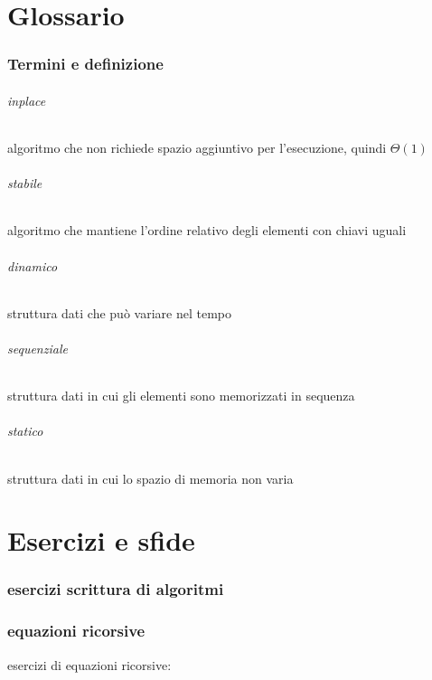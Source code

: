 \documentclass{article}
\begin{document}
\part{Glossario} %
\section{Termini e definizione}

\paragraph{inplace} algoritmo che non richiede spazio aggiuntivo per l'esecuzione, quindi $\Theta(1)$

\paragraph{stabile} algoritmo che mantiene l'ordine relativo degli elementi con chiavi uguali

\paragraph{dinamico} struttura dati che può variare nel tempo

\paragraph{sequenziale} struttura dati in cui gli elementi sono memorizzati in sequenza

\paragraph{statico} struttura dati in cui lo spazio di memoria non varia




\part{Esercizi e sfide} %
\section{esercizi scrittura di algoritmi}
\section{equazioni ricorsive}
esercizi di equazioni ricorsive:
\end{document}
